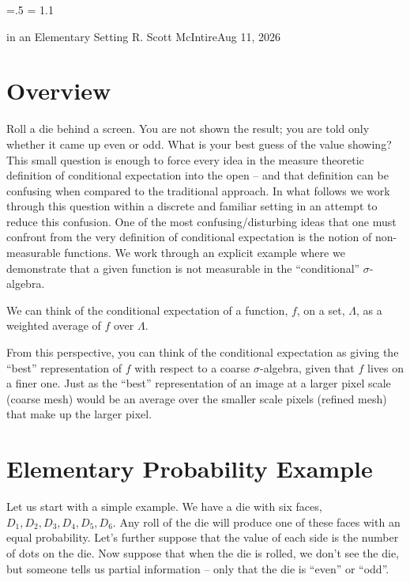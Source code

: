 




\parindent=0pt
\parskip=.5\baselineskip
\baselineskip = 1.1\baselineskip

\footline{\hss\tenrm\folio\hss}

        {in an Elementary Setting}
{R. Scott McIntire}{Aug 11, 2026}

\section{Overview}
Roll a die behind a screen. You are not shown the result; you are told
only whether it came up even or odd. What is your best guess of the value
showing? This small question is enough to force every idea in the measure
theoretic definition of conditional expectation into the open -- and that
definition can be confusing
when compared to the traditional approach.
In what follows we work through this question within a discrete and familiar
setting in an attempt
to reduce this confusion. One of the most confusing/disturbing ideas that 
one must confront from the very definition of conditional expectation is 
the notion of non-measurable functions. We work through an explicit
example where we demonstrate that a given function is not measurable in 
the ``conditional'' $\sigma$-algebra.

We can think of the conditional expectation of a function, $f$, on a set, $\Lambda$,
as a weighted average of $f$ over $\Lambda$.

From this perspective, you can think of the conditional expectation as
giving the ``best'' representation of $f$ with respect to a coarse $\sigma$-algebra,
given that $f$ lives on a finer one. Just as the ``best'' representation of an
image at a larger pixel scale (coarse mesh) would be an average over the smaller
scale pixels (refined mesh) that make up the larger pixel.
 

\section{Elementary Probability Example}
Let us start with a simple example. We have a die with six faces, $D_1, D_2, D_3, D_4, D_5, D_6$.
Any roll of the die will produce one of these faces with an equal probability. Let's further suppose
that the value of each side is the number of dots on the die. Now suppose that when the die is
rolled, we don't see the die, but someone tells us partial information -- only that the die is ``even'' or ``odd''.

